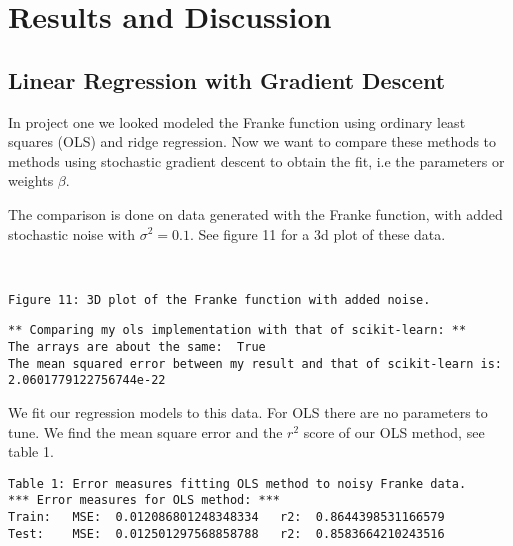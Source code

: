 \documentclass[11pt]{article}
\begin{document}
    \hypertarget{results-and-discussion}{%
\section{Results and Discussion}\label{results-and-discussion}}

\hypertarget{linear-regression-with-gradient-descent}{%
\subsection{Linear Regression with Gradient
Descent}\label{linear-regression-with-gradient-descent}}

In project one we looked modeled the Franke function using ordinary
least squares (OLS) and ridge regression. Now we want to compare these
methods to methods using stochastic gradient descent to obtain the fit,
i.e the parameters or weights \(\beta\).

The comparison is done on data generated with the Franke function, with
added stochastic noise with \(\sigma^2=0.1\). See figure 11 for a 3d
plot of these data.

    \begin{center}
    \end{center}
    { \hspace*{\fill} \\}
    
    \begin{Verbatim}[commandchars=\\\{\}]
Figure 11: 3D plot of the Franke function with added noise.
    \end{Verbatim}

    \begin{Verbatim}[commandchars=\\\{\}]
** Comparing my ols implementation with that of scikit-learn: **
The arrays are about the same:  True
The mean squared error between my result and that of scikit-learn is:
2.0601779122756744e-22
    \end{Verbatim}

    We fit our regression models to this data. For OLS there are no
parameters to tune. We find the mean square error and the \(r^2\) score
of our OLS method, see table 1.


    \begin{Verbatim}[commandchars=\\\{\}]
Table 1: Error measures fitting OLS method to noisy Franke data.
*** Error measures for OLS method: ***
Train:   MSE:  0.012086801248348334   r2:  0.8644398531166579
Test:    MSE:  0.012501297568858788   r2:  0.8583664210243516
    \end{Verbatim}
\end{document}

